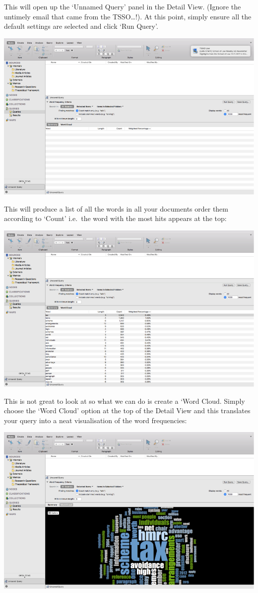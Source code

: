 \documentclass[]{book}
\theoremstyle{definition}
\theoremstyle{definition}
\theoremstyle{definition}
\theoremstyle{remark}
\begin{document}
This will open up the `Unnamed Query' panel in the Detail View. (Ignore
the untimely email that came from the TSSO\ldots{}!). At this point,
simply ensure all the default settings are selected and click `Run
Query'.

\includegraphics{imgs/qual_22.png}

This will produce a list of all the words in all your documents order
them according to `Count' i.e.~the word with the most hits appears at
the top:

\includegraphics{imgs/qual_23.png}

This is not great to look at so what we can do is create a `Word Cloud.
Simply choose the `Word Cloud' option at the top of the Detail View and
this translates your query into a neat visualisation of the word
frequencies:

\includegraphics{imgs/qual_24.png}
\end{document}
